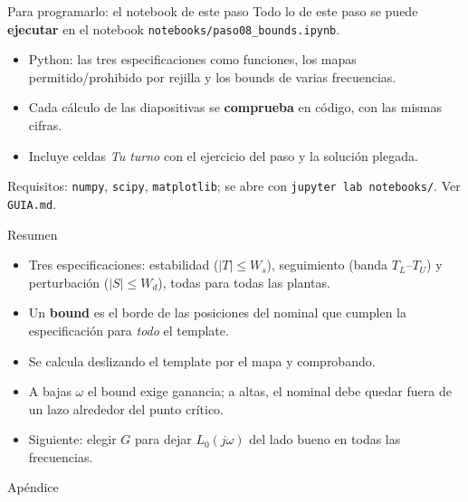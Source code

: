 \documentclass[aspectratio=169,11pt]{beamer}
\begin{document}
\begin{frame}{Para programarlo: el notebook de este paso}
  \small
  Todo lo de este paso se puede \textbf{ejecutar} en el notebook \texttt{notebooks/paso08\_bounds.ipynb}.
  \begin{itemize}
    \item Python: las tres especificaciones como funciones, los mapas permitido/prohibido por rejilla y los bounds de varias frecuencias.
    \item Cada cálculo de las diapositivas se \textbf{comprueba} en código, con las mismas cifras.
    \item Incluye celdas \emph{Tu turno} con el ejercicio del paso y la solución plegada.
  \end{itemize}
  \footnotesize Requisitos: \texttt{numpy}, \texttt{scipy}, \texttt{matplotlib}; se abre con \texttt{jupyter lab notebooks/}. Ver \texttt{GUIA.md}.
\end{frame}

\begin{frame}{Resumen}
  \small
  \begin{itemize}
    \item Tres especificaciones: estabilidad ($|T|\le W_s$), seguimiento (banda $T_L$--$T_U$) y perturbación ($|S|\le W_d$), todas para todas las plantas.
    \item Un \textbf{bound} es el borde de las posiciones del nominal que cumplen la especificación para \emph{todo} el template.
    \item Se calcula deslizando el template por el mapa y comprobando.
    \item A bajas $\omega$ el bound exige ganancia; a altas, el nominal debe quedar fuera de un lazo alrededor del punto crítico.
    \item Siguiente: elegir $G$ para dejar $L_0(j\omega)$ del lado bueno en todas las frecuencias.
  \end{itemize}
\end{frame}

\appendix
\begin{frame}\centering\Large Apéndice\end{frame}
\end{document}
